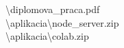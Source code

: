\noindent \textbackslash diplomova\_praca.pdf\\
\textbackslash aplikacia\textbackslash{node\_server.zip}\\
\textbackslash aplikacia\textbackslash{colab.zip}\\

